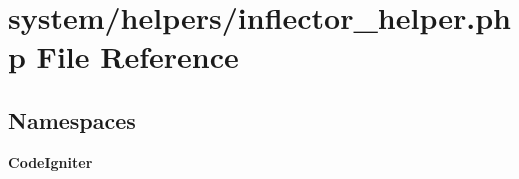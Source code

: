 \section{system/helpers/inflector\-\_\-helper.php File Reference}
\label{inflector__helper_8php}
\subsection*{Namespaces}
\begin{DoxyCompactItemize}
\item 
{\bf Code\-Igniter}
\end{DoxyCompactItemize}
